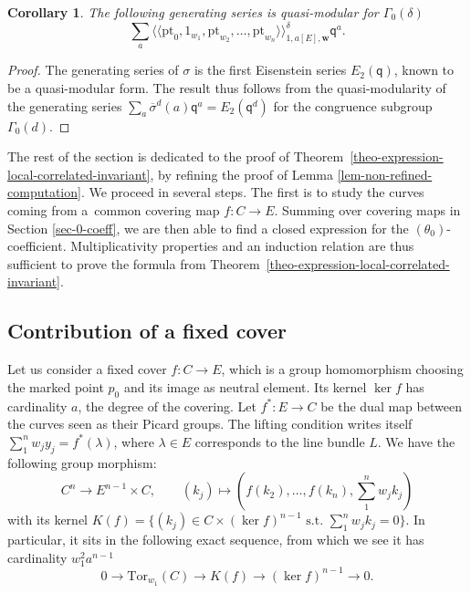 \documentclass[pdftex]{sigma}
\newcommand{\Tor}{\mathrm{Tor}}
\newcommand{\pt}{\mathrm{pt}}
\newcommand{\bfw}{ {\boldsymbol w} }
\newcommand{\sfq}{\mathsf{q}}
\numberwithin{equation}{section}
\newtheorem{coro}[theo]{Corollary}
\theoremstyle{definition}
\begin{document}
\begin{coro}
The following generating series is quasi-modular for $\Gamma_0(\delta)$
\[ \sum_a \langle\langle \pt_0,1_{w_1},\pt_{w_2},\dots,\pt_{w_n} \rangle\rangle^\delta_{1,a[E],\bfw}\sfq^a.\]
\end{coro}

\begin{proof}
 The generating series of $\sigma$ is the first Eisenstein series $E_2(\sfq)$, known to be a quasi-modular form. The result thus follows from the quasi-modularity of the generating series $\sum_a \overline{\sigma}^d(a)\sfq^a = E_2(\sfq^d)$ for the congruence subgroup $\Gamma_0(d)$.
\end{proof}

The rest of the section is dedicated to the proof of Theorem~\ref{theo-expression-local-correlated-invariant}, by refining the proof of Lemma \ref{lem-non-refined-computation}. We proceed in several steps. The first is to study the curves coming from a~common covering map $f\colon C\to E$. Summing over covering maps in Section \ref{sec-0-coeff}, we are then able to find a closed expression for the $(\theta_0)$-coefficient. Multiplicativity properties and an induction relation are thus sufficient to prove the formula from Theorem~\ref{theo-expression-local-correlated-invariant}.

 \subsection{Contribution of a fixed cover}

 Let us consider a fixed cover $f\colon C\to E$, which is a group homomorphism choosing the marked point $p_0$ and its image as neutral element. Its kernel $\ker f$ has cardinality $a$, the degree of the covering. Let $f^*\colon E\to C$ be the dual map between the curves seen as their Picard groups. The lifting condition writes itself $\sum_1^n w_jy_j=f^*(\lambda)$, where $\lambda\in E$ corresponds to the line bundle $L$. We have the following group morphism:
 \[
 C^n \longrightarrow E^{n-1}\times C, \qquad
 (k_j) \longmapsto \left(f(k_2),\dots,f(k_n),\sum_1^n w_jk_j \right)
 \]
 with its kernel $K(f)=\big\{ (k_j)\in C\times(\ker f)^{n-1} \text{ s.t. } \sum_1^n w_jk_j=0 \big\}$. In particular, it sits in the following exact sequence, from which we see it has cardinality $w_1^2 a^{n-1}$
 \[ 0\to \Tor_{w_1}(C) \to K(f) \to (\ker f)^{n-1} \to 0. \]
\end{document}
